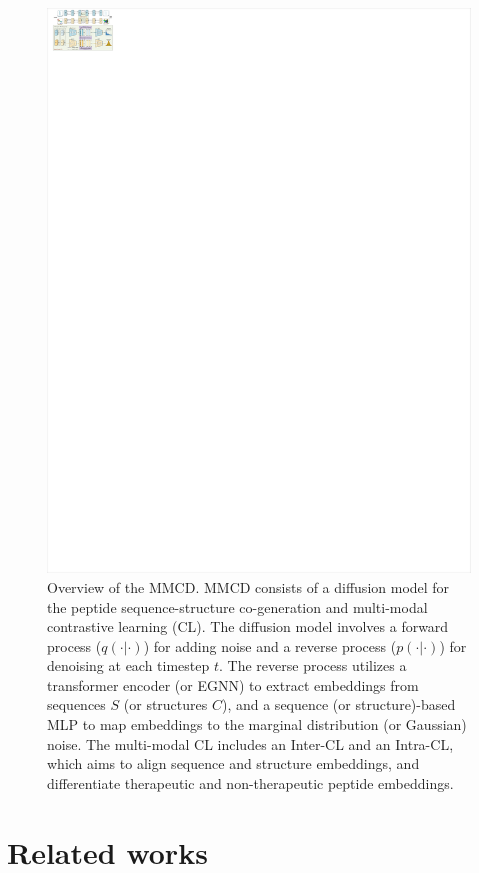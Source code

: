 \documentclass[letterpaper]{article} %
\begin{document}
\begin{figure}[ht]
\centering
\includegraphics[scale=0.74]{fig1.pdf}
\caption{Overview of the MMCD. MMCD consists of a diffusion model for the peptide sequence-structure co-generation and multi-modal contrastive learning (CL). The diffusion model involves a forward process ($q(\cdot|\cdot)$) for adding noise and a reverse process ($p(\cdot|\cdot)$) for denoising at each timestep $t$. The reverse process utilizes a transformer encoder (or EGNN) to extract embeddings from sequences $S$ (or structures $C$), and a sequence (or structure)-based MLP to map embeddings to the marginal distribution (or Gaussian) noise. The multi-modal CL includes an Inter-CL and an Intra-CL, which aims to align sequence and structure embeddings, and differentiate therapeutic and non-therapeutic peptide embeddings.}
\end{figure}

\section{Related works}
\end{document}
